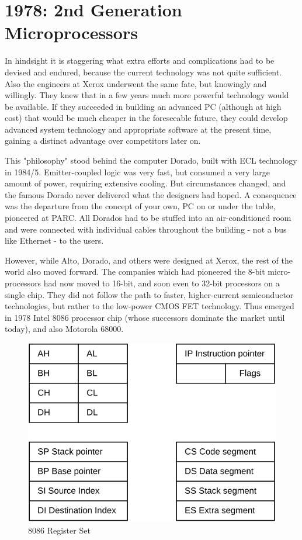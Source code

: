 \section{1978: 2nd Generation Microprocessors}
In hindsight it is staggering what extra efforts and complications had to be devised
and endured, because the current technology was not quite sufficient. Also the
engineers at Xerox underwent the same fate, but knowingly and willingly. They
knew that in a few years much more powerful technology would be available. If
they succeeded in building an advanced PC (although at high cost) that would be
much cheaper in the foreseeable future, they could develop advanced system
technology and appropriate software at the present time, gaining a distinct
advantage over competitors later on.

This "philosophy" stood behind the computer Dorado, built with ECL technology in
1984/5. Emitter-coupled logic was very fast, but consumed a very large amount of
power, requiring extensive cooling. But circumstances changed, and the famous
Dorado never delivered what the designers had hoped. A consequence was the
departure from the concept of your own, PC on or under the table, pioneered at
PARC. All Dorados had to be stuffed into an air-conditioned room and were
connected with individual cables throughout the building - not a bus like Ethernet
- to the users.

However, while Alto, Dorado, and others were designed at Xerox, the rest of the
world also moved forward. The companies which had pioneered the 8-bit
micro-processors had now moved to 16-bit, and soon even to 32-bit processors on a
single chip. They did not follow the path to faster, higher-current semiconductor
technologies, but rather to the low-power CMOS FET technology. Thus emerged
in 1978 Intel 8086 processor chip (whose successors dominate the market until
today), and also Motorola 68000.
\begin{figure}[h!]
  \centering
  \includegraphics[width=.9\textwidth]{i/5}
  \caption{8086 Register Set}
\end{figure}
 
